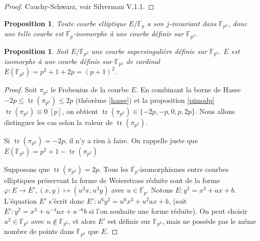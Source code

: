 \documentclass{article}
\theoremstyle{plain}%
\newtheorem{prop}[thm]{Proposition}
\theoremstyle{definition}%
\newcommand{\F}{\mathbb{F}}
\DeclareMathOperator{\tr}{tr}
\begin{document}
\begin{proof}
  Cauchy-Schwarz, voir Silverman V.1.1.  
\end{proof}

\begin{prop}
  Toute courbe elliptique $E/\overline{\F_p}$ a son $j$-invariant dans $\F_{p^2}$, donc une telle courbe est $\overline{\F_p}$-isomorphe à une courbe définie sur $\F_{p^2}$. 
\end{prop}

\begin{prop}
\label{cardsuper} 
  Soit $E/\F_{p^2}$ une courbe supersingulière définie sur $\F_{p^2}$. $E$ est isomorphe à une courbe définie sur $\F_{p^2}$ de cardinal $E(\F_{p^2}) = p^2 + 1 + 2p = (p+1)^2$.
\end{prop}

\begin{proof}
  Soit $\pi_{p^2}$ le Frobenius de la courbe $E$. En combinant la borne de Hasse $-2p \le \tr(\pi_{p^2}) \le 2p$ (théorème \ref{hasse}) et la proposition \ref{pimodp} $\tr(\pi_{p^2}) \equiv 0\ [p]$, on obtient $\tr(\pi_{p^2}) \in \{-2p, -p, 0, p, 2p\}$.  Nous allons distinguer les cas selon la valeur de $\tr(\pi_{p^2})$.
   
  \vspace{1em}
  Si $\tr(\pi_{p^2}) = -2p$, il n'y a rien à faire. On rappelle juste que $E(\F_{p^2}) = p^2 + 1 - \tr(\pi_{p^2})$ 
    
  \vspace{1em}
  Supposons que $\tr(\pi_{p^2}) = 2p$. Tous les $\overline{\F_p}$-isomorphismes entre courbes elliptiques préservant la forme de Weierstrass réduite sont de la forme 
      $\varphi : E \to E', (x, y) \mapsto (u^2 x, u^3 y)$ avec $u\in\overline{\F_p}$. Notons $E : y^2 = x^3 + ax +b$. L'équation $E'$ s'écrit donc $E' : u^6 y^2 = u^6 x^3 + u^2 a x + b$, (soit $E' : y^2 = x^3 + u^{-4} a x + u^{-6}b$ si l'on souhaite une forme réduite). On peut choisir $u^2\in\F_{p^2}$ avec $u\notin \F_{p^2}$, et alors $E'$ est définie sur $\F_{p^2}$, mais ne possède pas le même nombre de points dans $\F_{p^2}$ que $E$.


\end{proof}
\end{document}
